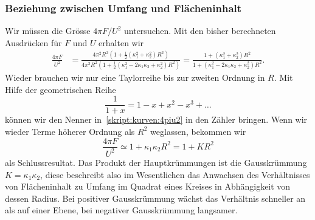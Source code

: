 \subsubsection{Beziehung zwischen Umfang und Flächeninhalt}
Wir müssen die Grösse $4\pi F/U^2$ untersuchen.
Mit den bisher berechneten Ausdrücken für $F$ und $U$ erhalten wir
\begin{align}
\frac{4\pi F}{U^2}
&=
\frac{4\pi^2R^2(1+{\textstyle\frac12}(\kappa_1^2 + \kappa_2^2)R^2)}%
{4\pi^2 R^2(1+{\textstyle\frac12}(\kappa_1^2-2\kappa_1\kappa_2+\kappa_2^2)R^2)}
=
\frac{1+(\kappa_1^2 + \kappa_2^2)R^2}%
{1+(\kappa_1^2-2\kappa_1\kappa_2+\kappa_2^2)R^2}.
\label{skript:kurven:4piu2}
\end{align}
Wieder brauchen wir nur eine Taylorreihe bis zur zweiten Ordnung in $R$.
Mit Hilfe der geometrischen Reihe 
\[
\frac1{1+x}= 1-x+x^2-x^3+\dots
\]
können wir den Nenner in~\eqref{skript:kurven:4piu2} in den Zähler
bringen.
Wenn wir wieder Terme höherer Ordnung als $R^2$ weglassen, bekommen
wir 
\begin{equation}
\frac{4\pi F}{U^2}
\simeq
1+\kappa_1\kappa_2R^2
=
1 + KR^2
\end{equation}
als Schlussresultat.
Das Produkt der Hauptkrümmungen ist die Gausskrümmung $K=\kappa_1\kappa_2$,
diese beschreibt also im Wesentlichen das Anwachsen des Verhältnisses
von Flächeninhalt zu Umfang im Quadrat eines Kreises in Abhängigkeit
von dessen Radius.
Bei positiver Gausskrümmung wächst das Verhältnis schneller an
als auf einer Ebene, bei negativer Gausskrümmung langsamer.





